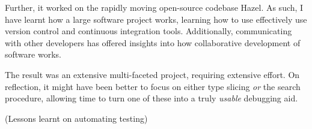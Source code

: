 Further, it worked on the rapidly moving open-source codebase Hazel. As such, I have learnt how a large software project works, learning how to use effectively use version control and continuous integration tools. Additionally, communicating with other developers has offered insights into how collaborative development of software works.

The result was an extensive multi-faceted project, requiring extensive effort. On reflection, it might have been better to focus on either type slicing \textit{or} the search procedure, allowing time to turn one of these into a truly \textit{usable} debugging aid.

(Lessons learnt on automating testing)